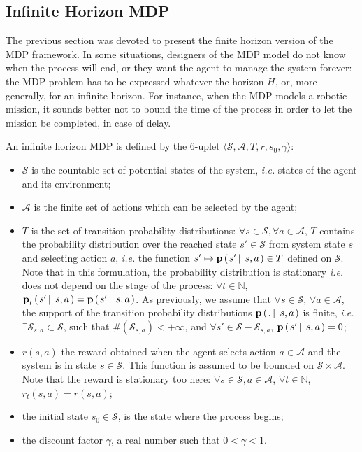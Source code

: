 \subsection{Infinite Horizon MDP} \label{subsectionIHMDP}
The previous section was devoted to present 
the finite horizon version of the MDP framework.
In some situations, designers of the MDP model
do not know when the process will end,
or they want the agent to manage the system forever: 
the MDP problem has to be expressed whatever the horizon $H$,
or, more generally, for an infinite horizon.
For instance, when the MDP models a robotic mission,
it sounds better not to bound the time of the process
in order to let the mission be completed, 
in case of delay.

An infinite horizon MDP 
is defined by the $6$-uplet 
$\langle \mathcal{S},\mathcal{A},T,r,s_0,\gamma \rangle$:
\begin{itemize}
\item $\mathcal{S}$ is the countable set of potential states of the system, 
\textit{i.e.} states of the agent and its environment;
\item $\mathcal{A}$ is the finite set of actions 
which can be selected by the agent;
\item $T$ is the set of transition probability distributions:
$ \forall s \in \mathcal{S}, \forall a \in \mathcal{A}$,
$T$ contains the probability distribution over the reached state $s' \in \mathcal{S}$
from system state $s$ and selecting action $a$,
\textit{i.e.}
the function $s' \mapsto \textbf{p} \left( \left.  s' \, \right| \left. \, s,a \right. \right) \in T$ 
defined on $\mathcal{S}$.
Note that in this formulation,
the probability distribution is stationary
\textit{i.e.} does not depend on the stage of the process:	
$\forall t \in \mathbb{N}$, $\textbf{p}_t \left( \left.  s' \, \right| \left. \, s,a \right. \right) = \textbf{p} \left( \left.  s' \, \right| \left. \, s,a \right. \right) $.
As previously, we assume that 
$\forall s \in \mathcal{S}$, $\forall a \in \mathcal{A}$, 
the support of the transition probability distributions 
$\mathbf{p} \left( \left.  . \, \right| \left. \, s,a  \right. \right)$ is finite, 
\textit{i.e.} $\exists \mathcal{S}_{s,a} \subset \mathcal{S}$, such that
$\# (\mathcal{S}_{s,a})< +\infty$, 
and $\forall s' \in \mathcal{S} - \mathcal{S}_{s,a}$, 
$\textbf{p} \left( \left.  s' \, \right| \left. \, s,a \right. \right)=0$;
\item $r(s,a)$ the reward obtained when the agent
selects action $a \in \mathcal{A}$
and the system is in state $s \in \mathcal{S}$.
This function is assumed to be bounded
on $\mathcal{S} \times \mathcal{A}$.
Note that the reward is stationary too here:
$\forall s \in \mathcal{S}, a \in \mathcal{A}$, 
$\forall t \in \mathbb{N}$,
$r_t(s,a) = r(s,a)$;
\item the initial state $s_0 \in \mathcal{S}$,
is the state where the process begins;
\item the discount factor $\gamma$, 
a real number such that $0<\gamma<1$.
\end{itemize}
